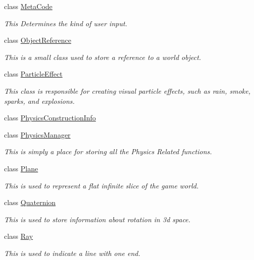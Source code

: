 \begin{DoxyCompactItemize}
class \hyperlink{classphys_1_1MetaCode}{MetaCode}
\begin{DoxyCompactList}\small\item\em This Determines the kind of user input. \item\end{DoxyCompactList}\item 
class \hyperlink{classphys_1_1ObjectReference}{ObjectReference}
\begin{DoxyCompactList}\small\item\em This is a small class used to store a reference to a world object. \item\end{DoxyCompactList}\item 
class \hyperlink{classphys_1_1ParticleEffect}{ParticleEffect}
\begin{DoxyCompactList}\small\item\em This class is responsible for creating visual particle effects, such as rain, smoke, sparks, and explosions. \item\end{DoxyCompactList}\item 
class \hyperlink{classphys_1_1PhysicsConstructionInfo}{PhysicsConstructionInfo}
\item 
class \hyperlink{classphys_1_1PhysicsManager}{PhysicsManager}
\begin{DoxyCompactList}\small\item\em This is simply a place for storing all the Physics Related functions. \item\end{DoxyCompactList}\item 
class \hyperlink{classphys_1_1Plane}{Plane}
\begin{DoxyCompactList}\small\item\em This is used to represent a flat infinite slice of the game world. \item\end{DoxyCompactList}\item 
class \hyperlink{classphys_1_1Quaternion}{Quaternion}
\begin{DoxyCompactList}\small\item\em This is used to store information about rotation in 3d space. \item\end{DoxyCompactList}\item 
class \hyperlink{classphys_1_1Ray}{Ray}
\begin{DoxyCompactList}\small\item\em This is used to indicate a line with one end. \item\end{DoxyCompactList}\item 

\end{DoxyCompactItemize}
